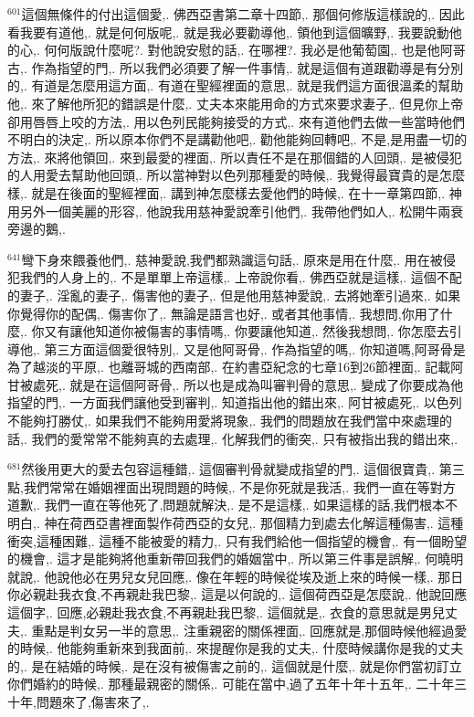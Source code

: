 \documentclass{book}
\begin{document}
$^{601}$這個無條件的付出這個愛,.
佛西亞書第二章十四節,.
那個何修版這樣說的,.
因此看我要有道他,.
就是何何版呢,.
就是我必要勸導他,.
領他到這個曠野,.
我要說動他的心,.
何何版說什麼呢?.
對他說安慰的話,.
在哪裡?.
我必是他葡萄園,.
也是他阿哥古,.
作為指望的門,.
所以我們必須要了解一件事情,.
就是這個有道跟勸導是有分別的,.
有道是怎麼用這方面,.
有道在聖經裡面的意思,.
就是我們這方面很溫柔的幫助他,.
來了解他所犯的錯誤是什麼,.
丈夫本來能用命的方式來要求妻子,.
但見你上帝卻用唇唇上咬的方法,.
用以色列民能夠接受的方式,.
來有道他們去做一些當時他們不明白的決定,.
所以原本你們不是講勸他吧,.
勸他能夠回轉吧,.
不是,是用盡一切的方法,.
來將他領回,.
來到最愛的裡面,.
所以責任不是在那個錯的人回頭,.
是被侵犯的人用愛去幫助他回頭,.
所以當神對以色列那種愛的時候,.
我覺得最寶貴的是怎麼樣,.
就是在後面的聖經裡面,.
講到神怎麼樣去愛他們的時候,.
在十一章第四節,.
神用另外一個美麗的形容,.
他說我用慈神愛說牽引他們,.
我帶他們如人,.
松開牛兩衰旁邊的鵝,.

$^{641}$彎下身來餵養他們,.
慈神愛說,我們都熟識這句話,.
原來是用在什麼,.
用在被侵犯我們的人身上的,.
不是單單上帝這樣,.
上帝說你看,.
佛西亞就是這樣,.
這個不配的妻子,.
淫亂的妻子,.
傷害他的妻子,.
但是他用慈神愛說,.
去將她牽引過來,.
如果你覺得你的配偶,.
傷害你了,.
無論是語言也好,.
或者其他事情,.
我想問,你用了什麼,.
你又有讓他知道你被傷害的事情嗎,.
你要讓他知道,.
然後我想問,.
你怎麼去引導他,.
第三方面這個愛很特別,.
又是他阿哥骨,.
作為指望的嗎,.
你知道嗎,阿哥骨是為了越淡的平原,.
也離哥城的西南部,.
在約書亞紀念的七章16到26節裡面,.
記載阿甘被處死,.
就是在這個阿哥骨,.
所以也是成為叫審判骨的意思,.
變成了你要成為他指望的門,.
一方面我們讓他受到審判,.
知道指出他的錯出來,.
阿甘被處死,.
以色列不能夠打勝仗,.
如果我們不能夠用愛將現象,.
我們的問題放在我們當中來處理的話,.
我們的愛常常不能夠真的去處理,.
化解我們的衝突,.
只有被指出我的錯出來,.

$^{681}$然後用更大的愛去包容這種錯,.
這個審判骨就變成指望的門,.
這個很寶貴,.
第三點,我們常常在婚姻裡面出現問題的時候,.
不是你死就是我活,.
我們一直在等對方道歉,.
我們一直在等他死了,問題就解決,.
是不是這樣,.
如果這樣的話,我們根本不明白,.
神在荷西亞書裡面製作荷西亞的女兒,.
那個精力到處去化解這種傷害,.
這種衝突,這種困難,.
這種不能被愛的精力,.
只有我們給他一個指望的機會,.
有一個盼望的機會,.
這才是能夠將他重新帶回我們的婚姻當中,.
所以第三件事是誤解,.
何曉明就說,.
他說他必在男兒女兒回應,.
像在年輕的時候從埃及逝上來的時候一樣,.
那日你必親赴我衣食,不再親赴我巴黎,.
這是以何說的,.
這個荷西亞是怎麼說,.
他說回應這個字,.
回應,必親赴我衣食,不再親赴我巴黎,.
這個就是,.
衣食的意思就是男兒丈夫,.
重點是判女另一半的意思,.
注重親密的關係裡面,.
回應就是,那個時候他經過愛的時候,.
他能夠重新來到我面前,.
來提醒你是我的丈夫,.
什麼時候講你是我的丈夫的,.
是在結婚的時候,.
是在沒有被傷害之前的,.
這個就是什麼,.
就是你們當初訂立你們婚約的時候,.
那種最親密的關係,.
可能在當中,過了五年十年十五年,.
二十年三十年,問題來了,傷害來了,.
\end{document}
